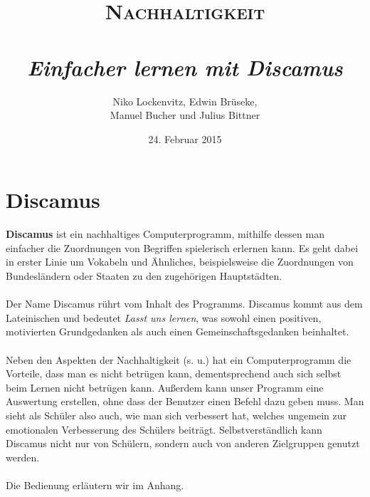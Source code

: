 \documentclass[a4paper, 11pt, titlepage]{article}
\author{Niko Lockenvitz, Edwin Brüseke,\\Manuel Bucher und Julius Bittner}
\title{\textsc{Nachhaltigkeit}\\\ \\\textsl{Einfacher lernen mit Discamus}}
\date{24. Februar 2015}
\begin{document}
\maketitle
\tableofcontents

\section{Discamus}
\textbf{Discamus} ist ein nachhaltiges Computerprogramm, mithilfe dessen man einfacher die Zuordnungen von Begriffen spielerisch erlernen kann. Es geht dabei in erster Linie um Vokabeln und Ähnliches, beispielsweise die Zuordnungen von Bundesländern oder Staaten zu den zugehörigen Hauptstädten.\\\\
Der Name Discamus rührt vom Inhalt des Programms. Discamus kommt aus dem Lateinischen und bedeutet \textit{Lasst uns lernen}, was sowohl einen positiven, motivierten Grundgedanken als auch einen Gemeinschaftsgedanken beinhaltet.\\\\
Neben den Aspekten der Nachhaltigkeit (s. u.) hat ein Computerprogramm die Vorteile, dass man es nicht betrügen kann, dementsprechend auch sich selbst beim Lernen nicht betrügen kann. Außerdem kann unser Programm eine Auswertung erstellen, ohne dass der Benutzer einen Befehl dazu geben muss. Man sieht als Schüler also auch, wie man sich verbessert hat, welches ungemein zur emotionalen Verbesserung des Schülers beiträgt. Selbstverständlich kann Discamus nicht nur von Schülern, sondern auch von anderen Zielgruppen genutzt werden.\\\\
Die Bedienung erläutern wir im Anhang.
\end{document}
